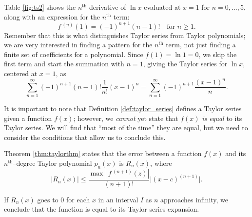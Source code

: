 \begin{solution}
{Table \ref{fig:ts2} shows the $n^\text{th}$ derivative of $\ln x$ evaluated at $x=1$ for $n=0,\ldots,5$, along with an expression for the $n^\text{th}$ term: $$f\,^{(n)}(1) = (-1)^{n+1}(n-1)!\quad \text{for $n\geq 1$.}$$ Remember that this is what distinguishes Taylor series from Taylor polynomials; we are very interested in finding a pattern for the $n^\text{th}$ term, not just finding a finite set of coefficients for a polynomial.
Since $f(1) = \ln 1 = 0$, we skip the first term and start the summation with $n=1$, giving the Taylor series for $\ln x$, centered at $x=1$, as 
$$\sum_{n=1}^\infty (-1)^{n+1}(n-1)!\frac{1}{n!}(x-1)^n = \sum_{n=1}^\infty (-1)^{n+1}\frac{(x-1)^n}{n}. $$
}
\end{solution}




%
It is important to note that Definition \ref{def:taylor_series} defines a Taylor series given a function $f(x)$; however, we \emph{cannot} yet state that $f(x)$ \emph{is equal} to its Taylor series. We will find that ``most of the time'' they are equal, but we need to consider the conditions that allow us to conclude this.

Theorem \ref{thm:taylorthm} states that the error between a function $f(x)$ and its $n^\text{th}$--degree Taylor polynomial $p_n(x)$ is $R_n(x)$, where
$$ \big|R_n(x)\big| \leq \frac{\max\left|\,f\,^{(n+1)}(z)\right|}{(n+1)!}\big|(x-c)^{(n+1)}\big|.$$

If $R_n(x)$ goes to 0 for each $x$ in an interval $I$ as $n$ approaches infinity, we conclude that the function is equal to its Taylor series expansion.


